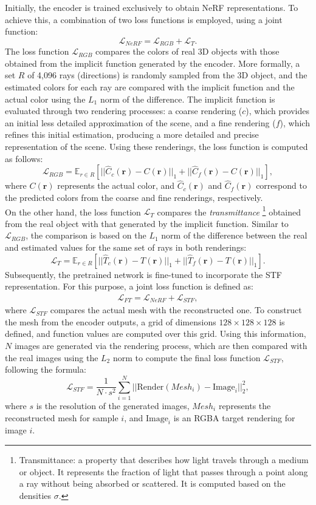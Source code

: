 \documentclass[journal]{IEEEtran}
\begin{document}
Initially, the encoder is trained exclusively to obtain NeRF representations. To achieve this, a combination of two loss functions is employed, using a joint function:
$$
\mathcal{L}_{NeRF} = \mathcal{L}_{RGB} + \mathcal{L}_T.
$$
The loss function $\mathcal{L}_{RGB}$ compares the colors of real 3D objects with those obtained from the implicit function generated by the encoder. More formally, a set $R$ of 4,096 rays (directions) is randomly sampled from the 3D object, and the estimated colors for each ray are compared with the implicit function and the actual color using the $L_1$ norm of the difference. The implicit function is evaluated through two rendering processes: a coarse rendering ($c$), which provides an initial less detailed approximation of the scene, and a fine rendering ($f$), which refines this initial estimation, producing a more detailed and precise representation of the scene. Using these renderings, the loss function is computed as follows:
$$\mathcal{L}_{RGB} = \mathbb{E}_{r \in R} \left[||\hat{C}_c(\textbf{r}) - C(\textbf{r})||_1 + ||\hat{C}_f(\textbf{r}) - C(\textbf{r})||_1 \right],$$
where $C(\textbf{r})$ represents the actual color, and $\hat{C}_c(\textbf{r})$ and $\hat{C}_f(\textbf{r})$ correspond to the predicted colors from the coarse and fine renderings, respectively.
\\

On the other hand, the loss function $\mathcal{L}_T$ compares the \textit{transmittance} \footnote{Transmittance: a property that describes how light travels through a medium or object. It represents the fraction of light that passes through a point along a ray without being absorbed or scattered. It is computed based on the densities $\sigma$.} obtained from the real object with that generated by the implicit function. Similar to $\mathcal{L}_{RGB}$, the comparison is based on the $L_1$ norm of the difference between the real and estimated values for the same set of rays in both renderings:
$$\mathcal{L}_{T} = \mathbb{E}_{r \in R} \left[||\hat{T}_c(\textbf{r}) - T(\textbf{r})||_1 + ||\hat{T}_f(\textbf{r}) - T(\textbf{r})||_1 \right].$$
Subsequently, the pretrained network is fine-tuned to incorporate the STF representation. For this purpose, a joint loss function is defined as:
\begin{align*}
    \mathcal{L}_{FT} = \mathcal{L}_{NeRF} + \mathcal{L}_{STF},
\end{align*}
where $\mathcal{L}_{STF}$ compares the actual mesh with the reconstructed one. To construct the mesh from the encoder outputs, a grid of dimensions $128 \times 128 \times 128$ is defined, and function values are computed over this grid. Using this information, $N$ images are generated via the rendering process, which are then compared with the real images using the $L_2$ norm to compute the final loss function $\mathcal{L}_{STF}$, following the formula:
$$\mathcal{L}_{STF} = \frac{1}{N\cdot s^2} \sum_{i=1}^N ||\text{Render}(Mesh_i) - \text{Image}_i||_2^2,$$
where $s$ is the resolution of the generated images, $Mesh_i$ represents the reconstructed mesh for sample $i$, and $\text{Image}_i$ is an RGBA target rendering for image $i$.\\
\end{document}
